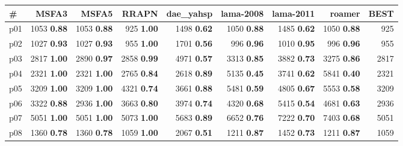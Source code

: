 \begin{tabular}{|l|rrrrrrr|r|}
\hline
\textbf{\#} & \textbf{MSFA3} & \textbf{MSFA5} & \textbf{RRAPN} & \textbf{dae\_yahsp} & \textbf{lama-2008} & \textbf{lama-2011} & \textbf{roamer} & \textbf{BEST}\\
\hline
p01 & {\footnotesize 1053} \textbf{0.88} & {\footnotesize 1053} \textbf{0.88} & {\footnotesize 925} \textbf{1.00} & {\footnotesize 1498} \textbf{0.62} & {\footnotesize 1050} \textbf{0.88} & {\footnotesize 1485} \textbf{0.62} & {\footnotesize 1050} \textbf{0.88} & 925\\
p02 & {\footnotesize 1027} \textbf{0.93} & {\footnotesize 1027} \textbf{0.93} & {\footnotesize 955} \textbf{1.00} & {\footnotesize 1701} \textbf{0.56} & {\footnotesize 996} \textbf{0.96} & {\footnotesize 1010} \textbf{0.95} & {\footnotesize 996} \textbf{0.96} & 955\\
p03 & {\footnotesize 2817} \textbf{1.00} & {\footnotesize 2890} \textbf{0.97} & {\footnotesize 2858} \textbf{0.99} & {\footnotesize 4971} \textbf{0.57} & {\footnotesize 3313} \textbf{0.85} & {\footnotesize 3882} \textbf{0.73} & {\footnotesize 3275} \textbf{0.86} & 2817\\
p04 & {\footnotesize 2321} \textbf{1.00} & {\footnotesize 2321} \textbf{1.00} & {\footnotesize 2765} \textbf{0.84} & {\footnotesize 2618} \textbf{0.89} & {\footnotesize 5135} \textbf{0.45} & {\footnotesize 3741} \textbf{0.62} & {\footnotesize 5841} \textbf{0.40} & 2321\\
p05 & {\footnotesize 3209} \textbf{1.00} & {\footnotesize 3209} \textbf{1.00} & {\footnotesize 4321} \textbf{0.74} & {\footnotesize 3661} \textbf{0.88} & {\footnotesize 5481} \textbf{0.59} & {\footnotesize 4805} \textbf{0.67} & {\footnotesize 5553} \textbf{0.58} & 3209\\
p06 & {\footnotesize 3322} \textbf{0.88} & {\footnotesize 2936} \textbf{1.00} & {\footnotesize 3663} \textbf{0.80} & {\footnotesize 3974} \textbf{0.74} & {\footnotesize 4320} \textbf{0.68} & {\footnotesize 5415} \textbf{0.54} & {\footnotesize 4681} \textbf{0.63} & 2936\\
p07 & {\footnotesize 5051} \textbf{1.00} & {\footnotesize 5051} \textbf{1.00} & {\footnotesize 5073} \textbf{1.00} & {\footnotesize 5683} \textbf{0.89} & {\footnotesize 6652} \textbf{0.76} & {\footnotesize 7222} \textbf{0.70} & {\footnotesize 7403} \textbf{0.68} & 5051\\
p08 & {\footnotesize 1360} \textbf{0.78} & {\footnotesize 1360} \textbf{0.78} & {\footnotesize 1059} \textbf{1.00} & {\footnotesize 2067} \textbf{0.51} & {\footnotesize 1211} \textbf{0.87} & {\footnotesize 1452} \textbf{0.73} & {\footnotesize 1211} \textbf{0.87} & 1059\\

\end{tabular}
